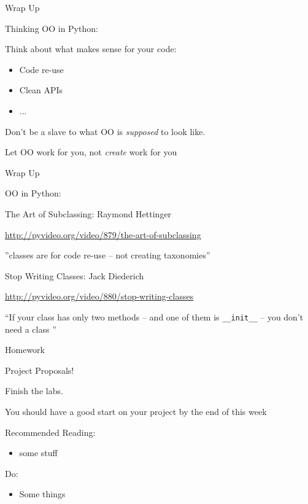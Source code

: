 \documentclass{beamer}
\begin{document}
\begin{frame}[fragile]{Wrap Up}

{\LARGE Thinking OO in Python:}

\vfill
{\large Think about what makes sense for your code:}
\begin{itemize}
  \item {\large Code re-use}
  \item {\large Clean APIs}
  \item {\large ... }
\end{itemize}

\vfill
{\large Don't be a slave to what OO is \emph{supposed} to look like. }

\vfill
{\large Let OO work for you, not \emph{create} work for you}

\end{frame}


\begin{frame}[fragile]{Wrap Up}

{\Large OO in Python:}

\vfill
{\Large The Art of Subclassing}: Raymond Hettinger

\vfill
{\small \url{http://pyvideo.org/video/879/the-art-of-subclassing}}

\vfill
''classes are for code re-use -- not creating taxonomies''

\vfill
{\Large Stop Writing Classes}: Jack Diederich

\vfill
{\small \url{http://pyvideo.org/video/880/stop-writing-classes}}

\vfill
``If your class has only two methods -- and one of them is \verb|__init__|
-- you don't need a class ''
\end{frame}




\begin{frame}[fragile]{Homework}

{\LARGE Project Proposals!}

{\Large Finish the labs.}

{\Large You should have a good start on your project by the end of this week}

Recommended Reading:
\begin{itemize}
  \item some stuff
\end{itemize}

Do:
\begin{itemize}
    \item Some things    
\end{itemize}

\end{frame}
\end{document}
